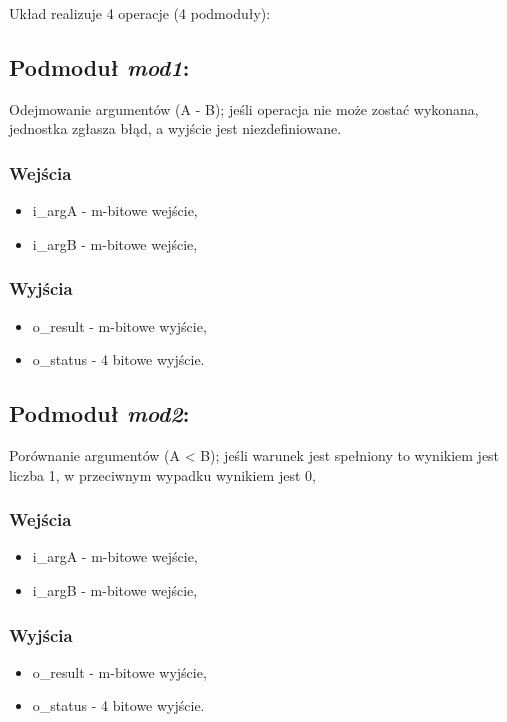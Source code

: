 Układ realizuje 4 operacje (4 podmoduły):

\subsection{Podmoduł \emph{mod1}:}
Odejmowanie argumentów (A - B); jeśli operacja nie może zostać wykonana, jednostka zgłasza błąd, a wyjście jest niezdefiniowane.

\subsubsection*{Wejścia}
\begin{itemize}
	\item i\_argA - m-bitowe wejście,
	\item i\_argB - m-bitowe wejście,
\end{itemize}
\subsubsection*{Wyjścia}
\begin{itemize}
	\item o\_result - m-bitowe wyjście,
	\item o\_status - 4 bitowe wyjście.
\end{itemize}

\subsection{Podmoduł \emph{mod2}:}
Porównanie argumentów (A < B); jeśli warunek jest spełniony to wynikiem jest liczba 1, w przeciwnym wypadku wynikiem jest 0,

\subsubsection*{Wejścia}
\begin{itemize}
	\item i\_argA - m-bitowe wejście,
	\item i\_argB - m-bitowe wejście,
\end{itemize}
\subsubsection*{Wyjścia}
\begin{itemize}
	\item o\_result - m-bitowe wyjście,
	\item o\_status - 4 bitowe wyjście.
\end{itemize}


